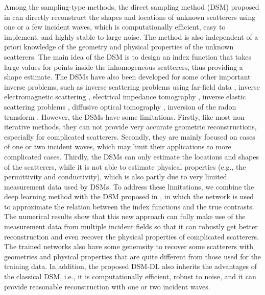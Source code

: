 \documentclass{article}
\begin{document}
	Among the sampling-type methods, the direct sampling method (DSM) proposed in \cite{ito2012direct} can directly reconstruct the shapes and locations of unknown scatterers using one or a few incident waves, which is computationally efficient, easy to implement, and highly stable to large noise. The method is also independent of a priori knowledge of the geometry and physical properties of the unknown scatterers. The main idea of the DSM is to design an index function that takes large values for points inside the inhomogeneous scatterers, thus providing a shape estimate.  The DSMs have also been developed for some other important inverse problems, such as inverse scattering problems using far-field data \cite{li2013direct}, inverse electromagnetic scattering \cite{ito2013direct,chow2022direct}, electrical impedance tomography \cite{chow2014direct}, inverse elastic scattering problems \cite{ji2018direct}, diffusive optical tomography \cite{chow2015direct}, inversion of the radon transform \cite{chow2021direct}. However, the DSMs have some limitations. Firstly, like most non-iterative methods, they can not provide very accurate geometric reconstructions, especially for complicated scatterers. Secondly, they are mainly focused on cases of one or two incident waves, which may limit their applications to more complicated cases. Thirdly, the DSMs can only estimate the locations and shapes of the scatterers, while it is not able to estimate physical properties (e.g., the permittivity and conductivity), which is also partly due to very limited measurement data used by DSMs. To address these limitations, we combine the deep learning method with the DSM proposed in \cite{ito2012direct}, in which the network is used to approximate the relation between the index functions and the true contrasts. The numerical results show that this new approach can fully make use of the measurement data from multiple incident fields so that it can robustly get better reconstruction and even recover the physical properties of complicated scatterers. The trained networks also have some generosity to recover some scatterers with geometries and physical properties that are quite different from those used for the training data. In addition, the proposed DSM-DL also inherits the advantages of the classical DSM, i.e., it is computationally efficient, robust to noise, and it can provide reasonable reconstruction with one or two incident waves.
	
\end{document}
